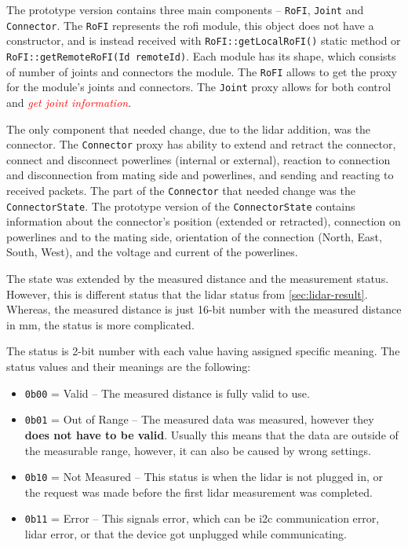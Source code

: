 \documentclass[
  digital,     %
  oneside,     %
  nosansbold,  %
  nocolorbold, %
  lof,         %
  lot,         %
]{fithesis4}
\newcommand{\TODO}[1]{\textcolor{red}{\textit{#1}}}
\begin{document}
{{{The prototype version contains three main components -- \lstinline|RoFI|, \lstinline|Joint| and \lstinline|Connector|. The \lstinline|RoFI| represents the \acrshort{rofi} module, this object does not have a constructor, and is instead received with \lstinline|RoFI::getLocalRoFI()| static method or \lstinline|RoFI::getRemoteRoFI(Id remoteId)|. Each module has its shape, which consists of number of joints and connectors the module. The \lstinline|RoFI| allows to get the proxy for the module's joints and connectors. The \lstinline|Joint| proxy allows for both control and \TODO{get joint information}.

The only component that needed change, due to the \acrshort{lidar} addition, was the connector. The \lstinline|Connector| proxy has ability to extend and retract the connector, connect and disconnect powerlines (internal or external), reaction to connection and disconnection from mating side and powerlines, and sending and reacting to received packets. The part of the \lstinline|Connector| that needed change was the \lstinline|ConnectorState|. The prototype version of the \lstinline|ConnectorState| contains information about the connector's position (extended or retracted), connection on powerlines and to the mating side, orientation of the connection (North, East, South, West), and the voltage and current of the powerlines.

The state was extended by the measured distance and the measurement status. However, this is different status that the \acrshort{lidar} status from \ref{sec:lidar-result}. Whereas, the measured distance is just 16-bit number with the measured distance in \unit{\mm}, the status is more complicated.

The status is 2-bit number with each value having assigned specific meaning. The status values and their meanings are the following:
\begin{itemize}
    \item \lstinline|0b00| = Valid -- The measured distance is fully valid to use.
    \item \lstinline|0b01| = Out of Range -- The measured data was measured, however they \textbf{does not have to be valid}. Usually this means that the data are outside of the measurable range, however, it can also be caused by wrong settings.
    \item \lstinline|0b10| = Not Measured -- This status is when the \acrshort{lidar} is not plugged in, or the request was made before the first \acrshort{lidar} measurement was completed.
    \item \lstinline|0b11| = Error -- This signals error, which can be  \acrshort{i2c} communication error, \acrshort{lidar} error, or that the device got unplugged while communicating.  
\end{itemize}

}}}
\end{document}
